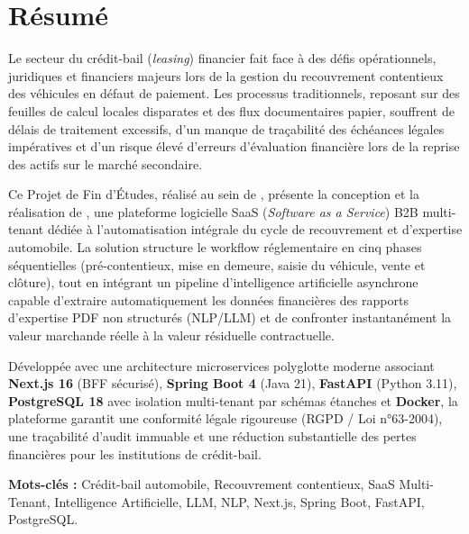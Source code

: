 
\chapter*{Résumé}

Le secteur du crédit-bail (\textit{leasing}) financier fait face à des défis opérationnels, juridiques et financiers majeurs lors de la gestion du recouvrement contentieux des véhicules en défaut de paiement. Les processus traditionnels, reposant sur des feuilles de calcul locales disparates et des flux documentaires papier, souffrent de délais de traitement excessifs, d'un manque de traçabilité des échéances légales impératives et d'un risque élevé d'erreurs d'évaluation financière lors de la reprise des actifs sur le marché secondaire.

Ce Projet de Fin d'Études, réalisé au sein de \textbf{\hostCompany}, présente la conception et la réalisation de \textbf{\projectShortTitle}, une plateforme logicielle SaaS (\textit{Software as a Service}) B2B multi-tenant dédiée à l'automatisation intégrale du cycle de recouvrement et d'expertise automobile. La solution structure le workflow réglementaire en cinq phases séquentielles (pré-contentieux, mise en demeure, saisie du véhicule, vente et clôture), tout en intégrant un pipeline d'intelligence artificielle asynchrone capable d'extraire automatiquement les données financières des rapports d'expertise PDF non structurés (NLP/LLM) et de confronter instantanément la valeur marchande réelle à la valeur résiduelle contractuelle.

Développée avec une architecture microservices polyglotte moderne associant \textbf{Next.js 16} (BFF sécurisé), \textbf{Spring Boot 4} (Java 21), \textbf{FastAPI} (Python 3.11), \textbf{PostgreSQL 18} avec isolation multi-tenant par schémas étanches et \textbf{Docker}, la plateforme garantit une conformité légale rigoureuse (RGPD / Loi n°63-2004), une traçabilité d'audit immuable et une réduction substantielle des pertes financières pour les institutions de crédit-bail.

\vspace{0.8cm}
\noindent\textbf{Mots-clés :} Crédit-bail automobile, Recouvrement contentieux, SaaS Multi-Tenant, Intelligence Artificielle, LLM, NLP, Next.js, Spring Boot, FastAPI, PostgreSQL.

